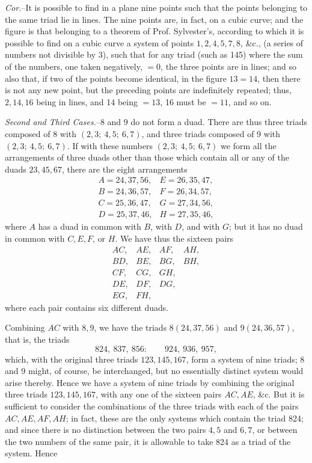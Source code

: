 \documentclass[10pt]{article}
\begin{document}
\emph{Cor.}--It is possible to find in a plane nine points such that the points
belonging to the same triad lie in lines. The nine points are, in fact, on a
cubic curve; and the figure is that belonging to a theorem of Prof. Sylvester's,
according to which it is possible to find on a cubic curve a system of points
$1,2,4,5,7,8$, \&c., (a series of numbers not divisible by 3), such that for
any triad (such as 145) where the sum of the numbers, one taken negatively,
$=0$, the three points are in lines; and so also that, if two of the points
become identical, in the figure $13=14$, then there is not any new point, but
the preceding points are indefinitely repeated; thus, $2,14,16$ being in lines,
and 14 being $=13$, 16 must be $=11$, and so on.

\emph{Second and Third Cases.}--8 and 9 do not form a duad. There are thus
three triads composed of 8 with $(2,3;\ 4,5;\ 6,7)$, and three triads composed
of 9 with $(2,3;\ 4,5;\ 6,7)$. If with these numbers $(2,3;\ 4,5;\ 6,7)$ we
form all the arrangements of three duads other than those which contain all or
any of the duads $23,45,67$, there are the eight arrangements
\[
\begin{array}{ll}
A=24,37,56, & E=26,35,47,\\
B=24,36,57, & F=26,34,57,\\
C=25,36,47, & G=27,34,56,\\
D=25,37,46, & H=27,35,46,
\end{array}
\]
where $A$ has a duad in common with $B$, with $D$, and with $G$; but it has no
duad in common with $C,E,F$, or $H$. We have thus the sixteen pairs
\[
\begin{array}{llll}
AC,&AE,&AF,&AH,\\
BD,&BE,&BG,&BH,\\
CF,&CG,&GH,\\
DE,&DF,&DG,\\
EG,&FH,
\end{array}
\]
where each pair contains six different duads.

Combining $AC$ with $8,9$, we have the triads $8(24,37,56)$ and $9(24,36,57)$,
that is, the triads
\[
        824,\ 837,\ 856:\qquad 924,\ 936,\ 957,
\]
which, with the original three triads $123,145,167$, form a system of nine
triads; 8 and 9 might, of course, be interchanged, but no essentially distinct
system would arise thereby. Hence we have a system of nine triads by combining
the original three triads $123,145,167$, with any one of the sixteen pairs
$AC,AE$, \&c. But it is sufficient to consider the combinations of the three
triads with each of the pairs $AC,AE,AF,AH$; in fact, these are the only
systems which contain the triad 824; and since there is no distinction between
the two pairs $4,5$ and $6,7$, or between the two numbers of the same pair, it
is allowable to take 824 as a triad of the system. Hence
\end{document}

